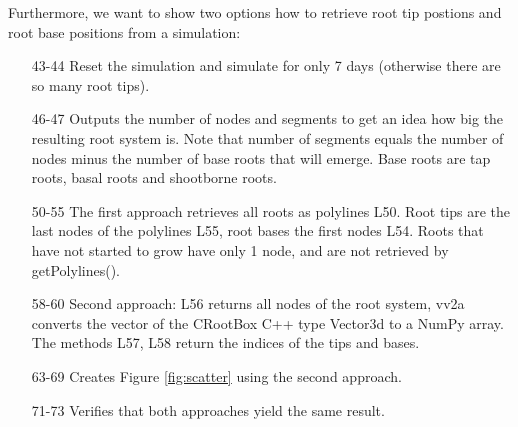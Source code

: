 \documentclass[a4paper]{article}
\begin{document}
Furthermore, we want to show two options how to retrieve root tip postions and root base positions from a simulation:



\begin{itemize}

\item[43-44] Reset the simulation and simulate for only 7 days (otherwise there are so many root tips).

\item[46-47] Outputs the number of nodes and segments to get an idea how big the resulting root system is. 
Note that number of segments equals the number of nodes minus the number of base roots that will emerge. Base roots are tap roots, basal roots and shootborne roots.

\item[50-55] The first approach retrieves all roots as polylines L50. Root tips are the last nodes of the polylines L55, root bases the first nodes L54. 
Roots that have not started to grow have only 1 node, and are not retrieved by getPolylines().

\item[58-60] Second approach: L56 returns all nodes of the root system, vv2a converts the vector of the CRootBox C++ type Vector3d to a NumPy array. 
The methods L57, L58 return the indices of the tips and bases. 

\item[63-69] Creates Figure \ref{fig:scatter} using the second approach.

\item[71-73] Verifies that both approaches yield the same result.

\end{itemize}
\end{document}
